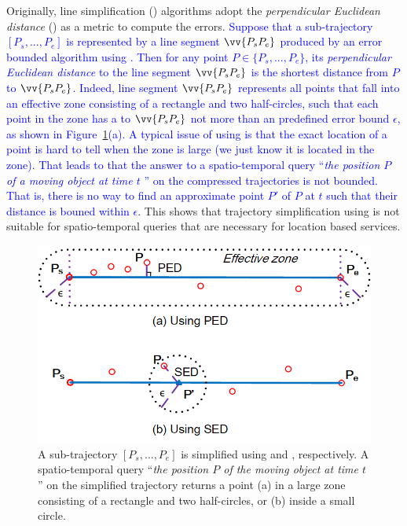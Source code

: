 Originally, line simplification (\lsa) algorithms adopt the \emph{perpendicular Euclidean distance} (\ped) as a metric to compute the errors.
\textcolor{blue}{Suppose that a sub-trajectory $[P_s, ..., P_e]$ is represented by a line segment $\vv{P_sP_e}$  produced by an error bounded \lsa algorithm using \ped. Then for any point $P \in \{P_s, ..., P_e\}$, its \emph{perpendicular Euclidean distance} to the line segment $\vv{P_sP_e}$  is the shortest distance from $P$ to $\vv{P_sP_e}$.}
\textcolor{blue}{Indeed, line segment $\vv{P_sP_e}$ represents all points that fall into an effective zone consisting of a rectangle and two half-circles, such that each point in the zone has a \ped to $\vv{P_sP_e}$ not more than an predefined error bound $\epsilon$,  as shown in Figure~\ref{fig:distances}(a).}
\textcolor{blue}{A typical issue of using \ped is that the exact location of a point is hard to tell when the zone is large (we just know it is located in the zone).}
%
\textcolor{blue}{That leads to that the answer to a spatio-temporal query ``\emph{the position $P$ of a moving object at time $t$} \cite{Cao:Spatio}'' on the compressed trajectories is not bounded. That is, there is no way to find an approximate point $P'$ of $P$ at $t$ such that their distance is bouned within $\epsilon$}.
This shows that trajectory simplification using \ped is not suitable for spatio-temporal queries that are necessary for location based services.
%



\begin{figure}[tb!]
\centering
\includegraphics[scale=1.2]{figures/Fig-Distances.png}
\caption{\small A sub-trajectory $[P_s, \ldots, P_e]$ is simplified using \ped and \sed, respectively. A spatio-temporal query ``\emph{the position $P$ of the moving object at time $t$}'' on the simplified trajectory returns a point (a) in a large zone consisting of a rectangle and two half-circles, or (b) inside a small circle.}
\vspace{-3ex}
\label{fig:distances}
\end{figure}

